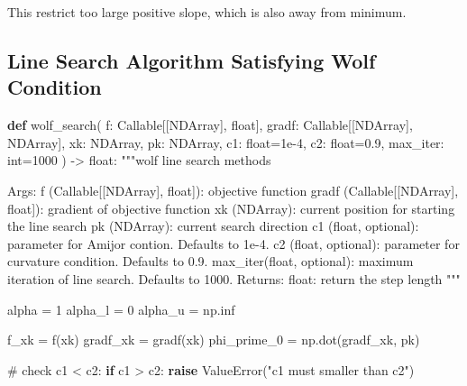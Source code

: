 \documentclass[
  letterpaper,
  DIV=11,
  numbers=noendperiod]{scrreprt}
\newenvironment{Shaded}{\begin{snugshade}}{\end{snugshade}}
\newcommand{\BuiltInTok}[1]{\textcolor[rgb]{0.00,0.23,0.31}{#1}}
\newcommand{\CommentTok}[1]{\textcolor[rgb]{0.37,0.37,0.37}{#1}}
\newcommand{\ControlFlowTok}[1]{\textcolor[rgb]{0.00,0.23,0.31}{\textbf{#1}}}
\newcommand{\DecValTok}[1]{\textcolor[rgb]{0.68,0.00,0.00}{#1}}
\newcommand{\FloatTok}[1]{\textcolor[rgb]{0.68,0.00,0.00}{#1}}
\newcommand{\KeywordTok}[1]{\textcolor[rgb]{0.00,0.23,0.31}{\textbf{#1}}}
\newcommand{\NormalTok}[1]{\textcolor[rgb]{0.00,0.23,0.31}{#1}}
\newcommand{\OperatorTok}[1]{\textcolor[rgb]{0.37,0.37,0.37}{#1}}
\newcommand{\PreprocessorTok}[1]{\textcolor[rgb]{0.68,0.00,0.00}{#1}}
\newcommand{\StringTok}[1]{\textcolor[rgb]{0.13,0.47,0.30}{#1}}
\theoremstyle{definition}
\theoremstyle{plain}
\theoremstyle{plain}
\theoremstyle{definition}
\theoremstyle{plain}
\theoremstyle{plain}
\theoremstyle{remark}
\begin{document}
This restrict too large positive slope, which is also away from minimum.

\subsection{Line Search Algorithm Satisfying Wolf
Condition}\label{line-search-algorithm-satisfying-wolf-condition}

\begin{Shaded}
\begin{Highlighting}[]
\KeywordTok{def}\NormalTok{ wolf\_search(}
\NormalTok{        f: Callable[[NDArray], }\BuiltInTok{float}\NormalTok{],}
\NormalTok{        gradf: Callable[[NDArray], NDArray],}
\NormalTok{        xk: NDArray,}
\NormalTok{        pk: NDArray,}
\NormalTok{        c1: }\BuiltInTok{float}\OperatorTok{=}\FloatTok{1e{-}4}\NormalTok{,}
\NormalTok{        c2: }\BuiltInTok{float}\OperatorTok{=}\FloatTok{0.9}\NormalTok{,}
\NormalTok{        max\_iter: }\BuiltInTok{int}\OperatorTok{=}\DecValTok{1000}
\NormalTok{) }\OperatorTok{{-}\textgreater{}} \BuiltInTok{float}\NormalTok{:}
    \CommentTok{"""wolf line search methods}

\CommentTok{    Args:}
\CommentTok{        f (Callable[[NDArray], float]): objective function}
\CommentTok{        gradf (Callable[[NDArray], float]): gradient of objective function}
\CommentTok{        xk (NDArray): current position for starting the line search}
\CommentTok{        pk (NDArray): current search direction}
\CommentTok{        c1 (float, optional): parameter for Amijor contion. Defaults to 1e{-}4.}
\CommentTok{        c2 (float, optional): parameter for curvature condition. Defaults to 0.9.}
\CommentTok{        max\_iter(float, optional): maximum iteration of line search. Defaults to 1000.}
\CommentTok{    Returns:}
\CommentTok{        float: return the step length}
\CommentTok{    """}    
    
\NormalTok{    alpha }\OperatorTok{=} \DecValTok{1}
\NormalTok{    alpha\_l }\OperatorTok{=} \DecValTok{0}
\NormalTok{    alpha\_u }\OperatorTok{=}\NormalTok{ np.inf}

\NormalTok{    f\_xk }\OperatorTok{=}\NormalTok{ f(xk)}
\NormalTok{    gradf\_xk }\OperatorTok{=}\NormalTok{ gradf(xk)}
\NormalTok{    phi\_prime\_0 }\OperatorTok{=}\NormalTok{ np.dot(gradf\_xk, pk)}

    \CommentTok{\# check c1 \textless{} c2:}
    \ControlFlowTok{if}\NormalTok{ c1 }\OperatorTok{\textgreater{}}\NormalTok{ c2:}
        \ControlFlowTok{raise} \PreprocessorTok{ValueError}\NormalTok{(}\StringTok{"c1 must smaller than c2"}\NormalTok{)}
    

\end{Highlighting}
\end{Shaded}
\end{document}
